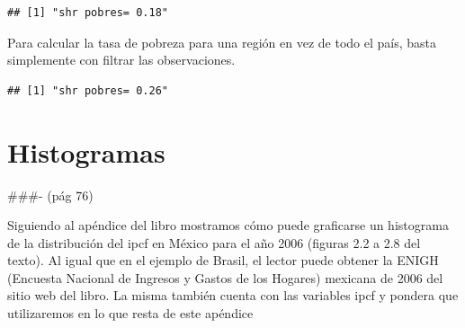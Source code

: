 \documentclass[
]{book}
\newenvironment{Shaded}{\begin{snugshade}}{\end{snugshade}}
\newcommand{\AttributeTok}[1]{\textcolor[rgb]{0.77,0.63,0.00}{#1}}
\newcommand{\CommentTok}[1]{\textcolor[rgb]{0.56,0.35,0.01}{\textit{#1}}}
\newcommand{\ConstantTok}[1]{\textcolor[rgb]{0.00,0.00,0.00}{#1}}
\newcommand{\DecValTok}[1]{\textcolor[rgb]{0.00,0.00,0.81}{#1}}
\newcommand{\DocumentationTok}[1]{\textcolor[rgb]{0.56,0.35,0.01}{\textbf{\textit{#1}}}}
\newcommand{\FunctionTok}[1]{\textcolor[rgb]{0.00,0.00,0.00}{#1}}
\newcommand{\NormalTok}[1]{#1}
\newcommand{\OtherTok}[1]{\textcolor[rgb]{0.56,0.35,0.01}{#1}}
\newcommand{\SpecialCharTok}[1]{\textcolor[rgb]{0.00,0.00,0.00}{#1}}
\newcommand{\StringTok}[1]{\textcolor[rgb]{0.31,0.60,0.02}{#1}}
\begin{document}
\begin{Shaded}
\end{Shaded}

\begin{verbatim}
## [1] "shr pobres= 0.18"
\end{verbatim}

Para calcular la tasa de pobreza para una región en vez de todo el país, basta simplemente con filtrar las observaciones.

\begin{Shaded}
\end{Shaded}

\begin{verbatim}
## [1] "shr pobres= 0.26"
\end{verbatim}

\hypertarget{histogramas}{%
\section{Histogramas}\label{histogramas}}

\#\#\#- (pág 76)

Siguiendo al apéndice del libro mostramos cómo puede graficarse un histograma de la distribución del ipcf en México para el año 2006 (figuras 2.2 a 2.8 del texto). Al igual que en el ejemplo de Brasil, el lector puede obtener la ENIGH (Encuesta Nacional de Ingresos y Gastos de los Hogares) mexicana de 2006 del sitio web del libro. La misma también cuenta con las variables ipcf y pondera que utilizaremos en lo que resta de este apéndice
\end{document}
